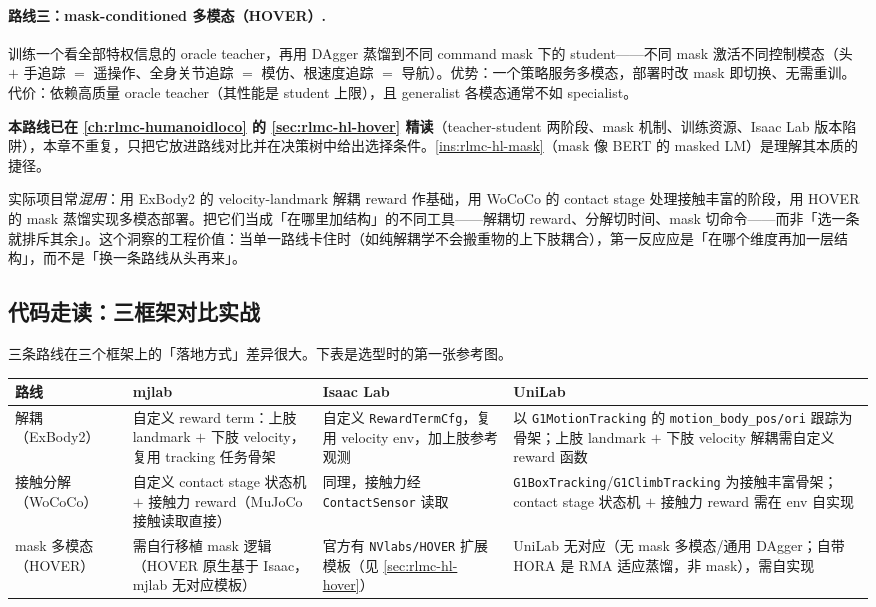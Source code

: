\paragraph{路线三：mask-conditioned 多模态（HOVER）.}
训练一个看全部特权信息的 oracle teacher，再用 DAgger 蒸馏到不同 command mask 下的 student——不同 mask 激活不同控制模态（头 $+$ 手追踪 $=$ 遥操作、全身关节追踪 $=$ 模仿、根速度追踪 $=$ 导航）。优势：一个策略服务多模态，部署时改 mask 即切换、无需重训。代价：依赖高质量 oracle teacher（其性能是 student 上限），且 generalist 各模态通常不如 specialist。

\textbf{本路线已在 \cref{ch:rlmc-humanoidloco} 的 \cref{sec:rlmc-hl-hover} 精读}（teacher-student 两阶段、mask 机制、训练资源、Isaac Lab 版本陷阱），本章不重复，只把它放进路线对比并在决策树中给出选择条件。\cref{ins:rlmc-hl-mask}（mask 像 BERT 的 masked LM）是理解其本质的捷径。

\begin{insight}\label{ins:rlmc-wbc-toolbox}
实际项目常\emph{混用}：用 ExBody2 的 velocity-landmark 解耦 reward 作基础，用 WoCoCo 的 contact stage 处理接触丰富的阶段，用 HOVER 的 mask 蒸馏实现多模态部署。把它们当成「在哪里加结构」的不同工具——解耦切 reward、分解切时间、mask 切命令——而非「选一条就排斥其余」。这个洞察的工程价值：当单一路线卡住时（如纯解耦学不会搬重物的上下肢耦合），第一反应应是「在哪个维度再加一层结构」，而不是「换一条路线从头再来」。
\end{insight}

\subsection{代码走读：三框架对比实战}
三条路线在三个框架上的「落地方式」差异很大。下表是选型时的第一张参考图。

\begin{center}
\small
\begin{tabular}{p{2.2cm}p{3.4cm}p{3.4cm}p{2.6cm}}
\hline
路线 & mjlab & Isaac Lab & UniLab \\
\hline
解耦（ExBody2） & 自定义 reward term：上肢 landmark $+$ 下肢 velocity，复用 tracking 任务骨架 & 自定义 \texttt{RewardTermCfg}，复用 velocity env，加上肢参考观测 & 以 \texttt{G1MotionTracking} 的 \texttt{motion\_body\_pos/ori} 跟踪为骨架；上肢 landmark $+$ 下肢 velocity 解耦需自定义 reward 函数\cite{unilab2026} \\
接触分解（WoCoCo） & 自定义 contact stage 状态机 $+$ 接触力 reward（MuJoCo 接触读取直接） & 同理，接触力经 \texttt{ContactSensor} 读取 & \texttt{G1BoxTracking}/\texttt{G1ClimbTracking} 为接触丰富骨架；contact stage 状态机 $+$ 接触力 reward 需在 env 自实现\cite{unilab2026} \\
mask 多模态（HOVER） & 需自行移植 mask 逻辑（HOVER 原生基于 Isaac，mjlab 无对应模板） & 官方有 \texttt{NVlabs/HOVER} 扩展模板（见 \cref{sec:rlmc-hl-hover}） & UniLab 无对应（无 mask 多模态/通用 DAgger；自带 HORA 是 RMA 适应蒸馏，非 mask），需自实现\cite{unilab2026} \\
\hline
\end{tabular}
\end{center}

